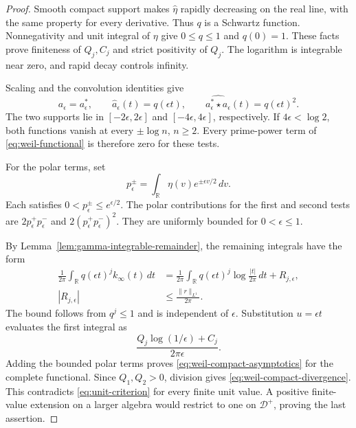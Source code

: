 \documentclass[11pt]{article}
\theoremstyle{definition}
\theoremstyle{remark}
\numberwithin{equation}{section}
\newcommand{\R}{\mathbb R}
\begin{document}
\begin{proof}
Smooth compact support makes $\widehat\eta$ rapidly decreasing on the
real line, with the same property for every derivative.
Thus $q$ is a Schwartz function.
Nonnegativity and unit integral of $\eta$ give
$0\leq q\leq1$ and $q(0)=1$.
These facts prove finiteness of $Q_j,C_j$ and strict positivity of $Q_j$.
The logarithm is integrable near zero, and rapid decay controls infinity.

Scaling and the convolution identities give
\[
 a_\epsilon=a_\epsilon^*,\qquad
 \widehat a_\epsilon(t)=q(\epsilon t),\qquad
 \widehat{a_\epsilon^*\star a_\epsilon}(t)=q(\epsilon t)^2.
\]
The two supports lie in $[-2\epsilon,2\epsilon]$ and
$[-4\epsilon,4\epsilon]$, respectively.
If $4\epsilon<\log2$, both functions vanish at every $\pm\log n$,
$n\geq2$.  Every prime-power term of \eqref{eq:weil-functional}
is therefore zero for these tests.

For the polar terms, set
\[
 p_\epsilon^\pm=\int_\R\eta(v)e^{\pm\epsilon v/2}\,dv.
\]
Each satisfies $0<p_\epsilon^\pm\leq e^{\epsilon/2}$.
The polar contributions for the first and second tests are
$2p_\epsilon^+p_\epsilon^-$ and
$2(p_\epsilon^+p_\epsilon^-)^2$.
They are uniformly bounded for $0<\epsilon\leq1$.

By Lemma~\ref{lem:gamma-integrable-remainder}, the remaining integrals
have the form
\[
 \begin{aligned}
 \frac1{2\pi}\int_\R q(\epsilon t)^j k_\infty(t)\,dt
 &=\frac1{2\pi}\int_\R q(\epsilon t)^j
                     \log\frac{|t|}{2\pi}\,dt+R_{j,\epsilon},\\
 |R_{j,\epsilon}|&\leq\frac{\|r\|_{L^1}}{2\pi}.
 \end{aligned}
\]
The bound follows from $q^j\leq1$ and is independent of $\epsilon$.
Substitution $u=\epsilon t$ evaluates the first integral as
\[
 \frac{Q_j\log(1/\epsilon)+C_j}{2\pi\epsilon}.
\]
Adding the bounded polar terms proves
\eqref{eq:weil-compact-asymptotics} for the complete functional.
Since $Q_1,Q_2>0$, division gives \eqref{eq:weil-compact-divergence}.
This contradicts \eqref{eq:unit-criterion} for every finite unit value.
A positive finite-value extension on a larger algebra would restrict
to one on $\mathscr D^+$, proving the last assertion.
\end{proof}
\end{document}
